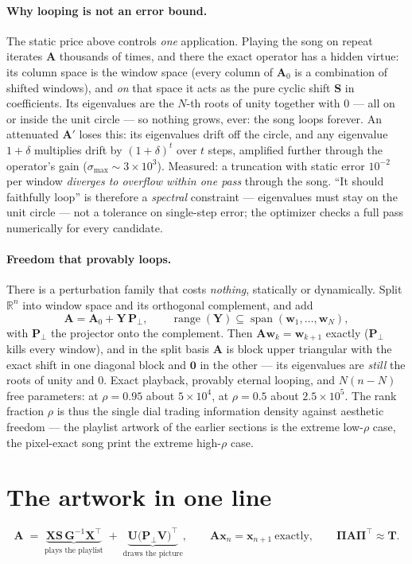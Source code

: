 \documentclass[11pt]{article}
\newcommand{\mA}{\bm{A}}
\newcommand{\mAo}{\bm{A}_0}
\newcommand{\mX}{\bm{X}}
\newcommand{\mS}{\bm{S}}
\newcommand{\mG}{\bm{G}}
\newcommand{\mPp}{\bm{P}_{\!\perp}}
\newcommand{\mU}{\bm{U}}
\newcommand{\mV}{\bm{V}}
\newcommand{\mY}{\bm{Y}}
\newcommand{\mT}{\bm{T}}
\newcommand{\pool}{\bm{\Pi}}
\newcommand{\vx}{\bm{x}}
\newcommand{\R}{\mathbb{R}}
\newcommand{\spanof}{\operatorname{span}}
\begin{document}
\paragraph{Why looping is not an error bound.}
The static price above controls \emph{one} application. Playing the song
on repeat iterates $\mA$ thousands of times, and there the exact operator
has a hidden virtue: its column space is the window space (every column
of $\mAo$ is a combination of shifted windows), and \emph{on} that space
it acts as the pure cyclic shift $\mS$ in coefficients. Its eigenvalues
are the $N$-th roots of unity together with $0$ --- all on or inside the
unit circle --- so nothing grows, ever: the song loops forever. An
attenuated $\mA'$ loses this: its eigenvalues drift off the circle, and
any eigenvalue $1+\delta$ multiplies drift by $(1+\delta)^{t}$ over $t$
steps, amplified further through the operator's gain
($\sigma_{\max} \sim 3\times10^{3}$). Measured: a truncation with static
error $10^{-2}$ per window \emph{diverges to overflow within one pass}
through the song. ``It should faithfully loop'' is therefore a
\emph{spectral} constraint --- eigenvalues must stay on the unit circle
--- not a tolerance on single-step error; the optimizer checks a full
pass numerically for every candidate.

\paragraph{Freedom that provably loops.}
There is a perturbation family that costs \emph{nothing}, statically or
dynamically. Split $\R^n$ into window space and its orthogonal
complement, and add
\begin{equation}
  \mA = \mAo + \mY\,\mPp,
  \qquad \operatorname{range}(\mY) \subseteq \spanof(\bm{w}_1,\dots,\bm{w}_N),
\end{equation}
with $\mPp$ the projector onto the complement. Then $\mA\bm{w}_k =
\bm{w}_{k+1}$ exactly ($\mPp$ kills every window), and in the split basis
$\mA$ is block upper triangular with the exact shift in one diagonal
block and $\bm{0}$ in the other --- its eigenvalues are \emph{still} the
roots of unity and $0$. Exact playback, provably eternal looping, and
$N(n-N)$ free parameters: at $\rho = 0.95$ about $5\times10^4$, at $\rho
= 0.5$ about $2.5\times10^5$. The rank fraction $\rho$ is thus the single
dial trading information density against aesthetic freedom --- the
playlist artwork of the earlier sections is the extreme low-$\rho$ case,
the pixel-exact song print the extreme high-$\rho$ case.

\section*{The artwork in one line}

\begin{equation*}
  \mA \;=\;
  \underbrace{\mX\mS\,\mG^{-1}\mX^\top}_{\text{plays the playlist}}
  \;+\;
  \underbrace{\mU\bigl(\mPp\mV\bigr)^{\!\top}}_{\text{draws the picture}},
  \qquad
  \mA\vx_n = \vx_{n+1}\ \text{exactly},
  \qquad
  \pool\mA\pool^{\!\top} \approx \mT .
\end{equation*}
\end{document}
